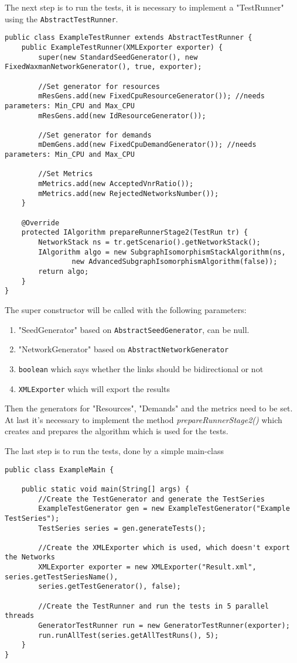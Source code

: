 The next step is to run the tests, it is necessary to implement a "TestRunner" using the \texttt{AbstractTestRunner}.
\begin{lstlisting}
public class ExampleTestRunner extends AbstractTestRunner {
	public ExampleTestRunner(XMLExporter exporter) {
		super(new StandardSeedGenerator(), new FixedWaxmanNetworkGenerator(), true, exporter);
		
		//Set generator for resources
		mResGens.add(new FixedCpuResourceGenerator()); //needs parameters: Min_CPU and Max_CPU
		mResGens.add(new IdResourceGenerator());
		
		//Set generator for demands
		mDemGens.add(new FixedCpuDemandGenerator()); //needs parameters: Min_CPU and Max_CPU
		
		//Set Metrics
		mMetrics.add(new AcceptedVnrRatio());
		mMetrics.add(new RejectedNetworksNumber());
	}

	@Override
	protected IAlgorithm prepareRunnerStage2(TestRun tr) {
		NetworkStack ns = tr.getScenario().getNetworkStack();
		IAlgorithm algo = new SubgraphIsomorphismStackAlgorithm(ns,
				new AdvancedSubgraphIsomorphismAlgorithm(false));
		return algo;
	}
}
\end{lstlisting}

The super constructor will be called with the following parameters:
\begin{enumerate}
	\item "SeedGenerator" based on \texttt{AbstractSeedGenerator}, can be null.
	\item "NetworkGenerator"  based on \texttt{AbstractNetworkGenerator}
	\item \texttt{boolean} which says whether the links should be bidirectional or not
	\item \texttt{XMLExporter} which will export the results
\end{enumerate}
Then the generators for "Resources", "Demands" and the metrics need to be set.
At last it's necessary to implement the method \textsl{prepareRunnerStage2()} which creates and prepares the algorithm which is used for the tests.

The last step is to run the tests, done by a simple main-class
\begin{lstlisting}
public class ExampleMain {

	public static void main(String[] args) {
		//Create the TestGenerator and generate the TestSeries
		ExampleTestGenerator gen = new ExampleTestGenerator("Example TestSeries");
		TestSeries series = gen.generateTests();
		
		//Create the XMLExporter which is used, which doesn't export the Networks
		XMLExporter exporter = new XMLExporter("Result.xml", series.getTestSeriesName(), 
		series.getTestGenerator(), false);
		
		//Create the TestRunner and run the tests in 5 parallel threads
		GeneratorTestRunner run = new GeneratorTestRunner(exporter);
		run.runAllTest(series.getAllTestRuns(), 5);
	}
}
\end{lstlisting}




